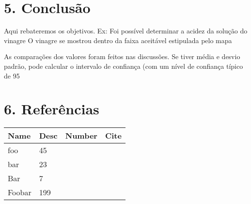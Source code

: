 \documentclass{article}%
\begin{document}
\section{5. Conclusão}%
\label{sec:5.Concluso}%

        Aqui rebateremos os objetivos. Ex: Foi possível determinar a acidez da solução do vinagre
        O vinagre se mostrou dentro da faixa aceitável estipulada pelo mapa
        
        As comparações dos valores foram feitos nas discussões. Se tiver média e desvio padrão, pode calcular o
        intervalo de confiança (com um nível de confiança típico de 95%

%
\section{6. Referências}%
\label{sec:6.Referncias}%
\begin{tabular}{@{}X[l] X[2l] X[r] X[r]@{}}%
\toprule%
\midrule%
\textbf{Name}&\textbf{Desc}&\textbf{Number}&\textbf{Cite}\\%
\midrule%
foo&45&&\cite{askin}\\%
bar&23&&\cite{bar}\\%
Bar&7&&\cite{angenendt}\\%
Foobar&199&&\cite{doody}\\\bottomrule%
%
\end{tabular}

%
\end{document}
